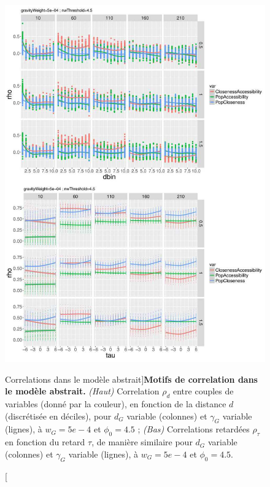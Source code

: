 \begin{figure}
	\includegraphics[width=\linewidth]{Figures/Final/6-2-2-fig-macrocoevol-correlations.jpg}
\caption[Correlations in the abstract model][Correlations dans le modèle abstrait]{}{\textbf{Motifs de correlation dans le modèle abstrait.} \textit{(Haut)} Correlation $\rho_d$ entre couples de variables (donné par la couleur), en fonction de la distance $d$ (discrétisée en déciles), pour $d_G$ variable (colonnes) et $\gamma_G$ variable (lignes), à $w_G = 5e-4$ et $\phi_0 = 4.5$ ; \textit{(Bas)} Correlations retardées $\rho_{\tau}$ en fonction du retard $\tau$, de manière similaire pour $d_G$ variable (colonnes) et $\gamma_G$ variable (lignes), à $w_G = 5e-4$ et $\phi_0 = 4.5$. \label{fig:macrocoevol:correlations}}
\end{figure}


